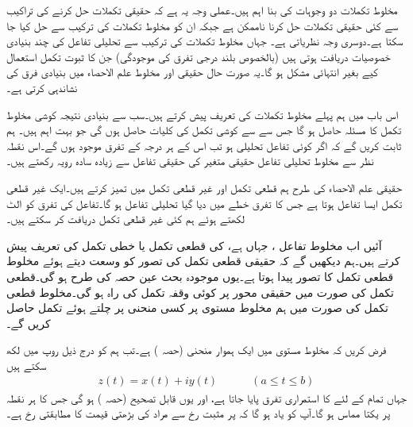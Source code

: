مخلوط تکملات دو وجوہات کی بنا اہم ہیں۔عملی وجہ یہ ہے کہ حقیقی تکملات حل کرنے کی تراکیب سے کئی حقیقی تکملات حل کرنا ناممکن ہے جبکہ ان کو مخلوط تکملات کی ترکیب سے حل کیا جا سکتا ہے۔دوسری وجہ نظریاتی ہے۔ جہاں مخلوط تکملات کی ترکیب سے تحلیلی تفاعل کی چند بنیادی خصوصیات دریافت ہوتی ہیں (بالخصوص بلند درجی تفرق کی موجودگی) جن کا ثبوت  تکمل استعمال کیے بغیر انتہائی مشکل ہو گا۔یہ صورت حال حقیقی اور مخلوط علم الاحصاء میں بنیادی فرق کی نشاندہی کرتی ہے۔

اس باب میں ہم پہلے مخلوط تکملات کی تعریف پیش کرتے ہیں۔سب سے بنیادی نتیجہ  کوشی مخلوط تکمل کا مسئلہ حاصل ہو گا جس سے  سے کوشی تکمل کی کلیات حاصل ہوں گی جو بہت اہم  ہیں۔ ہم ثابت کریں گے کہ اگر کوئی تفاعل تحلیلی ہو تب اس کے ہر درجہ کے تفرق موجود ہوں گے۔اس نقطہ نظر سے مخلوط تحلیلی تفاعل حقیقی متغیر کی حقیقی تفاعل سے زیادہ سادہ رویہ رکھتے ہیں۔

حقیقی علم الاحصاء کی طرح ہم قطعی تکمل اور غیر قطعی تکمل میں تمیز کرتے ہیں۔ایک غیر قطعی تکمل ایسا تفاعل ہوتا ہے جس کا تفرق خطے میں دیا گیا تحلیلی تفاعل ہو گا۔تفاعل کی تفرق کو الٹ لکھتے ہوئے ہم کئی غیر قطعی تکمل دریافت کر سکتے ہیں۔

آئیں اب مخلوط تفاعل ، جہاں  ہے، کی قطعی تکمل یا خطی تکمل کی تعریف پیش کرتے ہیں۔ہم دیکھیں گے کہ حقیقی قطعی تکمل کی تصور کو وسعت دیتے ہوئے  مخلوط قطعی تکمل کا تصور پیدا ہوتا ہے۔یوں موجودہ بحث عین حصہ  کی طرح ہو گی۔قطعی تکمل کی صورت میں حقیقی محور پر کوئی وقفہ تکمل کی راہ  ہو گی۔مخلوط قطعی تکمل کی صورت میں ہم مخلوط مستوی پر کسی منحنی پر چلتے ہوئے تکمل حاصل کریں گے۔

فرض کریں کہ  مخلوط  مستوی میں  ایک ہموار منحنی (حصہ ) ہے۔تب ہم  کو درج ذیل روپ میں لکھ سکتے ہیں
\begin{align}\label{مساوات_مخلوط_تکمل_راہ_الف}
z(t)=x(t)+iy(t)\quad \quad \quad (a\le t\le b)
\end{align}
جہاں تمام  کے لئے  کا استمراری تفرق  پایا جاتا ہے، اور یوں  قابل تصحیح (حصہ ) ہو گی جس کا ہر نقطہ پر یکتا مماس ہو گا۔آپ کو یاد ہو گا کہ  پر مثبت رخ سے مراد   کی بڑھتی قیمت کا مطابقتی رخ  ہے۔

